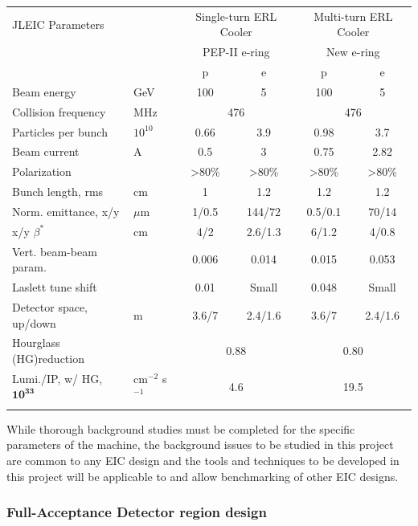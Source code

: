 \begin{center}
	\begin{tabular}{ l l c c c c } 
		JLEIC Parameters & & \multicolumn{2}{c}{Single-turn ERL Cooler} & \multicolumn{2}{c}{Multi-turn ERL Cooler}\\ 
		& & \multicolumn{2}{c}{PEP-II e-ring} & \multicolumn{2}{c}{New e-ring} \\
		\hline \hline
		& & p & e & p & e\\
		\hline
		Beam energy & GeV & 100 & 5 &100 &5 \\ 
		Collision frequency & MHz& \multicolumn{2}{c}{476} & \multicolumn{2}{c}{476}\\ 
		Particles per bunch & $10^10$ & 0.66 & 3.9& 0.98 & 3.7\\
		Beam current & A & 0.5 & 3 & 0.75 & 2.82\\
		Polarization &  & \textgreater80\% & \textgreater80\% & \textgreater80\% & \textgreater80\%\\
		Bunch length, rms & cm & 1 & 1.2 & 1.2 & 1.2 \\
		Norm. emittance, x/y& $\mu$m & 1/0.5 & 144/72 & 0.5/0.1 & 70/14 \\
		x/y $\beta^*$ & cm &4/2 & 2.6/1.3 & 6/1.2 & 4/0.8\\
		Vert. beam-beam param.& & 0.006 & 0.014 & 0.015 & 0.053\\
		Laslett tune shift & & 0.01 & Small & 0.048 & Small\\
		Detector space, up/down & m & 3.6/7 & 2.4/1.6 & 3.6/7 & 2.4/1.6\\
		Hourglass (HG)reduction & & \multicolumn{2}{c}{0.88} & \multicolumn{2}{c}{0.80}\\
		Lumi./IP, w/ HG, $\mathbf{10^{33}}$ & cm$^{-2}$ s$^{-1}$ & \multicolumn{2}{c}{4.6} & \multicolumn{2}{c}{19.5} \\
		\hline
		\label{table:parameters}
	\end{tabular}
\end{center}

While thorough background studies must be completed for the specific parameters of the machine, the background issues to be studied in this project are common to any EIC design and the tools and techniques to be developed in this project will be applicable to and allow benchmarking of other EIC designs.

\subsubsection{Full-Acceptance Detector region design}

